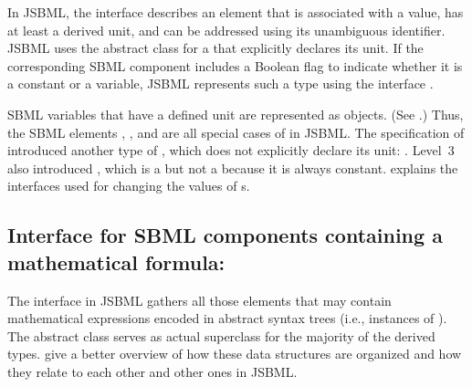 In JSBML, the interface \Quantity describes an element that is associated
with a value, has at least a derived unit, and can be addressed using its
unambiguous identifier. JSBML uses the abstract class \QuantityWithUnit for
a \Quantity that explicitly declares its unit.  If the corresponding SBML
component includes a Boolean  flag to indicate whether it is
a constant  or a variable, JSBML
represents such a type using the interface \Variable.

SBML variables  that have a defined unit are
represented as \Symbol objects.  (See .) Thus,
the SBML elements \Compartment, \Parameter, and \Species are all special
cases of \Symbol in JSBML.  The specification of \SBMLthree introduced
another type of \Variable, which does not explicitly declare its unit:
\SpeciesReference.  Level~3 also introduced \LocalParameter, which is a
\QuantityWithUnit but not a \Variable because it is always constant.
 explains the interfaces used for
changing the values of \Variable{}s.


\subsection{Interface for SBML components containing a mathematical
  formula: } 

The interface \MathContainer in JSBML gathers all those elements that may
contain mathematical expressions encoded in abstract syntax trees (i.e.,
instances of \ASTNode).  The abstract class \AbstractMathContainer serves
as actual superclass for the majority of the derived types.
 give a
better overview of how these data structures are organized and how they
relate to each other and other ones in JSBML.

